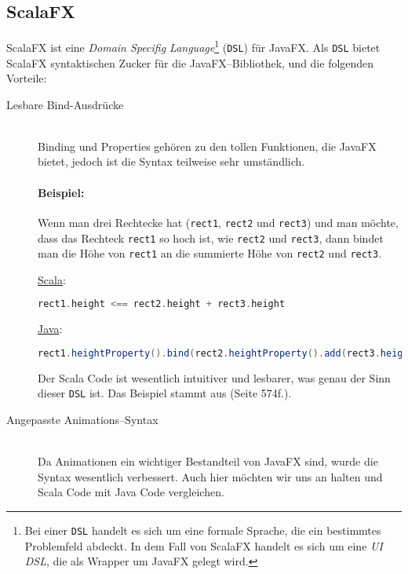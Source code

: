 \subsection{ScalaFX}
ScalaFX ist eine \textit{Domain Specifig Language}\footnote{Bei einer \texttt{DSL} handelt es sich um eine formale Sprache, die ein bestimmtes Problemfeld abdeckt. In dem Fall von ScalaFX handelt es sich um eine \textit{UI DSL}, die als Wrapper um JavaFX gelegt wird.} (\texttt{DSL}) für JavaFX. Als \texttt{DSL} bietet ScalaFX syntaktischen Zucker für die JavaFX--Bibliothek, und die folgenden Vorteile:

\begin{description}
\item[Lesbare Bind-Ausdrücke]\hfill\\
Binding und Properties gehören zu den tollen Funktionen, die JavaFX bietet, jedoch ist die Syntax teilweise sehr umständlich.
\paragraph{Beispiel:} Wenn man drei Rechtecke hat (\texttt{rect1}, \texttt{rect2} und \texttt{rect3}) und man möchte, dass das Rechteck \texttt{rect1} so hoch ist, wie \texttt{rect2} und \texttt{rect3}, dann bindet man die Höhe von \texttt{rect1} an die summierte Höhe von \texttt{rect2} und \texttt{rect3}.

\underline{Scala}:
\begin{lstlisting}[language=scala,caption=Scala Beispiel Code für natürliche Bindings,numbers=none]
rect1.height <== rect2.height + rect3.height
\end{lstlisting}

\underline{Java}:
\begin{lstlisting}[language=Java,caption=Das selbe Beispiel in Java,numbers=none]
rect1.heightProperty().bind(rect2.heightProperty().add(rect3.heightProperty()))
\end{lstlisting}

Der Scala Code ist wesentlich intuitiver und lesbarer, was genau der Sinn dieser \texttt{DSL} ist. Das Beispiel stammt aus \cite{ProJavaFX8} (Seite 574f.).

\item[Angepasste Animations--Syntax]\hfill\\
Da Animationen ein wichtiger Bestandteil von JavaFX sind, wurde die Syntax wesentlich verbessert. Auch hier möchten wir uns an \cite{ProJavaFX8} halten und Scala Code mit Java Code vergleichen.


\end{description}
